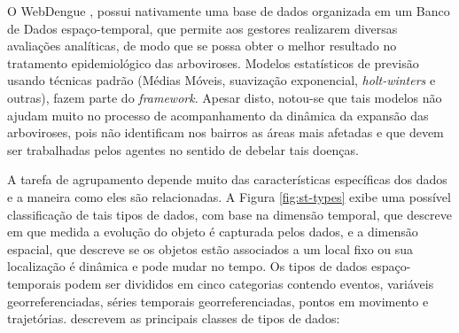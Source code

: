 O WebDengue \cite{webdengue2011}, possui nativamente uma base de dados organizada em um Banco de Dados espaço-temporal, que permite aos gestores realizarem diversas avaliações analíticas, de modo que se possa obter o melhor resultado no tratamento epidemiológico das arboviroses. Modelos estatísticos de previsão usando técnicas padrão (Médias Móveis, suavização exponencial, \emph{holt-winters} e outras), fazem parte do \emph{framework}. Apesar disto, notou-se que tais modelos não ajudam muito no processo de acompanhamento da dinâmica da expansão das arboviroses, pois não identificam nos bairros as áreas mais afetadas e que devem ser trabalhadas pelos agentes no sentido de debelar tais doenças.

A tarefa de agrupamento depende muito das características específicas dos dados e a maneira como eles são relacionadas. A Figura \ref{fig:st-types} exibe uma possível classificação de tais tipos de dados, com base na dimensão temporal, que descreve em que medida a evolução do objeto é capturada pelos dados, e a dimensão espacial, que descreve se os objetos estão associados a um local fixo ou sua localização é dinâmica e pode mudar no tempo.
Os tipos de dados espaço-temporais podem ser divididos em cinco categorias contendo eventos, variáveis georreferenciadas, séries temporais georreferenciadas, pontos em movimento e trajetórias.  descrevem as principais classes de tipos de dados:

\begin{figure}[!ht]
	\centering
\end{figure}

